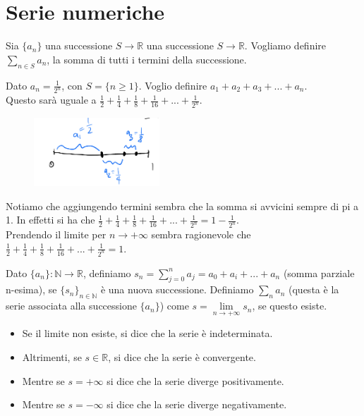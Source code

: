 \newpage
\section{Serie numeriche}
Sia $\{a_n\}$ una successione $S\to \mathbb{R}$ una successione $S\to \mathbb{R}$. Vogliamo definire $\sum\limits_{n\in S}a_n$, la somma di tutti i termini della successione.
\begin{example}
Dato $a_n = \frac{1}{2^n}$, con $S= \{n \geq 1\}$. Voglio definire $a_1 + a_2 + a_3 + ... + a_n$.\\
Questo sarà uguale a $\frac{1}{2} + \frac{1}{4} + \frac{1}{8} + \frac{1}{16} + ... + \frac{1}{2^n}$.
\end{example}
\begin{figure}
    \vspace{-25pt}
    \centering
    \includegraphics[width=4.7cm]{images/serie-numeriche.png}
\end{figure}
 Notiamo che aggiungendo termini sembra che la somma si avvicini sempre di pi a 1. In effetti si ha che $\frac{1}{2} + \frac{1}{4} + \frac{1}{8} + \frac{1}{16} + ... + \frac{1}{2^n} = 1 - \frac{1}{2^n}$.\\
Prendendo il limite per $n\to +\infty$ sembra ragionevole che $\frac{1}{2} + \frac{1}{4} + \frac{1}{8} + \frac{1}{16} + ... + \frac{1}{2^n} = 1$.\\

\begin{definition}
Dato $\{a_n\}: \mathbb{N} \to \mathbb{R}$, definiamo $s_n = \sum^n_{j=0}a_j = a_0 + a_i + ... + a_n$ (somma parziale n-esima), se $\{s_n\}_{n\in \mathbb{N}}$ è una nuova successione. Definiamo $\sum_{n}a_n$ (questa è la serie associata alla successione $\{a_n\}$) come $s = \lim\limits_{n\to +\infty}s_n$, se questo esiste. 
\begin{itemize}
    \item Se il limite non esiste, si dice che la serie è indeterminata.
    \item Altrimenti, se $s \in \mathbb{R}$, si dice che la serie è convergente.
    \item Mentre se $s = +\infty$ si dice che la serie diverge positivamente.
    \item Mentre se $s = -\infty$ si dice che la serie diverge negativamente.
\end{itemize}
\end{definition}

